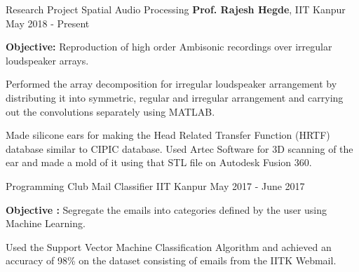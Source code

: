 \vspace{-0.3cm}
\begin{cventries}
  \cventry
    {Research Project}
    {Spatial Audio Processing}
    {\textbf{Prof. Rajesh Hegde}, IIT Kanpur}
    {May 2018 - Present}
    {
        \begin{cvitems}
          \item {\textbf{Objective: }Reproduction of high order Ambisonic recordings over irregular loudspeaker arrays.}
          \item {Performed the array decomposition for irregular loudspeaker arrangement by distributing it into symmetric, regular and irregular arrangement and carrying out the convolutions separately using MATLAB.}
          \item {Made silicone ears for making the Head Related Transfer Function (HRTF) database similar to CIPIC database. Used Artec Software for 3D scanning of the ear and made a mold of it using that STL file on Autodesk Fusion 360.}
        \end{cvitems}
    }
  \cventry
    {Programming Club}
    {Mail Classifier}
    {IIT Kanpur}
    {May 2017 - June 2017}
    {
      \begin{cvitems}
        \item {\textbf{Objective : }Segregate the emails into categories defined by the user using Machine Learning.}
        \item {Used the Support Vector Machine Classification Algorithm and achieved an accuracy of 98\% on the dataset consisting of emails from the IITK Webmail.}
      \end{cvitems}
    }
\end{cventries}
